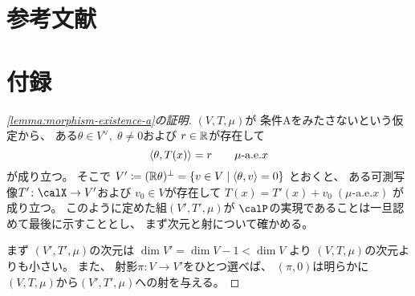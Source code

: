 \documentclass[report]{jlreq}
\begin{document}
\section*{参考文献}

\nocite{amari_information_2016}
\nocite{bn1970_pdf}
\nocite{BN78}

{
    \renewcommand{\bibsection}{}
    
    
}

%
\newpage
\appendix
\section*{付録}

\begin{proof}[\cref{lemma:morphism-existence-a}の証明]
    $(V, T, \mu)$が
    条件Aをみたさないという仮定から、
    ある$\theta \in V^\vee, \; \theta \neq 0$および
    $r \in \mathbb{R}$が存在して
    \begin{equation}
        \locallabel{eq:costant-pairing}
        \langle \theta, T(x) \rangle
            = r
            \qquad
            \text{$\mu$-a.e.$x$}
    \end{equation}
    が成り立つ。
    そこで
    $V' \coloneqq (\mathbb{R}\theta)^\perp
        = \{ v \in V \mid \langle \theta, v \rangle = 0 \}$
    とおくと、
    ある可測写像$T' \colon \calX \to V'$および
    $v_0 \in V$が存在して
    $T(x) = T'(x) + v_0 \; (\text{$\mu$-a.e.$x$})$
    が成り立つ。
    このように定めた組$(V', T', \mu)$が
    $\calP$の実現であることは一旦認めて最後に示すこととし、
    まず次元と射について確かめる。

    まず
    $(V', T', \mu)$の次元は
    $\dim V' = \dim V - 1 < \dim V$
    より
    $(V, T, \mu)$の次元よりも小さい。
    また、
    射影$\pi \colon V \to V'$をひとつ選べば、
    $(\pi, 0)$は明らかに
    $(V, T, \mu)$から$(V', T', \mu)$への射を与える。


\end{proof}
\end{document}

